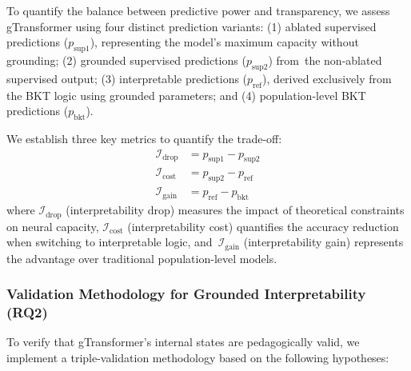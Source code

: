 \documentclass[applsci,article,accept,moreauthors,pdftex]{Definitions/mdpi}
\begin{document}
{To quantify the balance between predictive power and transparency, we assess gTransformer using four distinct prediction variants:}
{(1) ablated supervised predictions ($p_{\text{sup}1}$), representing the model's maximum capacity without grounding;}
{(2) grounded supervised predictions ($p_{\text{sup}2}$) from~the non-ablated supervised output;}
{(3) interpretable predictions ($p_{\text{ref}}$), derived exclusively from the BKT logic using grounded parameters; and}
{(4) population-level BKT predictions ($p_{\text{bkt}}$).}


{We establish three key metrics to quantify the trade-off:}
\begin{align}
\mathcal{I}_{\text{drop}} &= p_{\text{sup}1} - p_{\text{sup}2} \label{eq:int_drop} \\
\mathcal{I}_{\text{cost}} &= p_{\text{sup}2} - p_{\text{ref}}   \label{eq:int_cost} \\
\mathcal{I}_{\text{gain}} &= p_{\text{ref}} - p_{\text{bkt}}   \label{eq:int_gain}
\end{align}
where $\mathcal{I}_{\text{drop}}$ (interpretability drop) measures the impact of theoretical constraints on neural capacity, $\mathcal{I}_{\text{cost}}$ (interpretability cost) quantifies the accuracy reduction when switching to interpretable logic, and~$\mathcal{I}_{\text{gain}}$ (interpretability gain) represents the advantage over traditional population-level models.

\subsubsection{{Validation Methodology for Grounded Interpretability (RQ2)}} \label{sec:rq2_method}

{To verify that gTransformer's internal states are pedagogically valid, we implement a triple-validation methodology based on the following hypotheses:}
\end{document}
